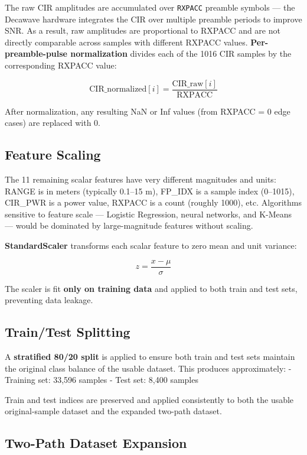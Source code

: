 \documentclass[12pt,a4paper]{article}
\newcommand{\passthrough}[1]{#1}
\providecommand{\passthrough}[1]{#1}
\begin{document}
The raw CIR amplitudes are accumulated over
\passthrough{\lstinline!RXPACC!} preamble symbols --- the Decawave
hardware integrates the CIR over multiple preamble periods to improve
SNR. As a result, raw amplitudes are proportional to RXPACC and are not
directly comparable across samples with different RXPACC values.
\textbf{Per-preamble-pulse normalization} divides each of the 1016 CIR
samples by the corresponding RXPACC value:

\[\mathrm{CIR\_normalized}[i] = \frac{\mathrm{CIR\_raw}[i]}{\mathrm{RXPACC}}\]

After normalization, any resulting NaN or Inf values (from RXPACC = 0
edge cases) are replaced with 0.

\subsection{Feature Scaling}\label{feature-scaling}

The 11 remaining scalar features have very different magnitudes and
units: RANGE is in meters (typically 0.1--15 m), FP\_IDX is a sample
index (0--1015), CIR\_PWR is a power value, RXPACC is a count (roughly
1000), etc. Algorithms sensitive to feature scale --- Logistic
Regression, neural networks, and K-Means --- would be dominated by
large-magnitude features without scaling.

\textbf{StandardScaler} transforms each scalar feature to zero mean and
unit variance:

\[z = \frac{x - \mu}{\sigma}\]

The scaler is fit \textbf{only on training data} and applied to both
train and test sets, preventing data leakage.

\subsection{Train/Test Splitting}\label{traintest-splitting}

A \textbf{stratified 80/20 split} is applied to ensure both train and
test sets maintain the original class balance of the usable dataset.
This produces approximately: - Training set: 33,596 samples - Test set:
8,400 samples

Train and test indices are preserved and applied consistently to both
the usable original-sample dataset and the expanded two-path dataset.

\subsection{Two-Path Dataset
Expansion}\label{two-path-dataset-expansion}
\end{document}
